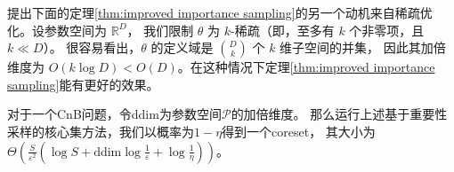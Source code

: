 提出下面的定理\ref{thm:improved importance sampling}的另一个动机来自稀疏优化。设参数空间为 $\mathbb{R}^D$，
我们限制 $\theta$ 为 $k$-稀疏（即，至多有 $k$ 个非零项，且 $k \ll D$）。
很容易看出，$\theta$ 的定义域是 $\binom{D}{k}$ 个 $k$ 维子空间的并集，
因此其加倍维度为 $O(k \log D)< O(D)$。在这种情况下定理\ref{thm:improved importance sampling}能有更好的效果。

\begin{theorem}
    对于一个CnB问题，令ddim为参数空间$\mathcal{P}$的加倍维度。
    那么运行上述基于重要性采样的核心集方法，我们以概率为$1-\eta$得到一个coreset，
    其大小为$\Theta\left(\frac{S}{\varepsilon^2}\left(\log S +\text{ddim}\log\frac{1}{\varepsilon}+\log \frac 1 \eta\right)\right)$。
    \label{thm:improved importance sampling}
\end{theorem}


